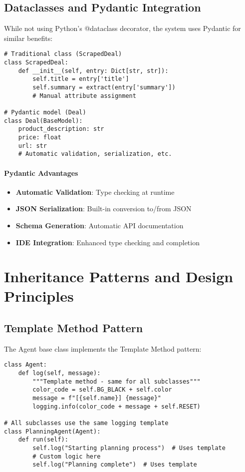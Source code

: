 \subsection{Dataclasses and Pydantic Integration}

While not using Python's @dataclass decorator, the system uses Pydantic for similar benefits:

\begin{lstlisting}[caption=Pydantic vs Traditional Classes]
# Traditional class (ScrapedDeal)
class ScrapedDeal:
    def __init__(self, entry: Dict[str, str]):
        self.title = entry['title']
        self.summary = extract(entry['summary'])
        # Manual attribute assignment

# Pydantic model (Deal)  
class Deal(BaseModel):
    product_description: str
    price: float
    url: str
    # Automatic validation, serialization, etc.
\end{lstlisting}

\paragraph{Pydantic Advantages}
\begin{itemize}
\item \textbf{Automatic Validation}: Type checking at runtime
\item \textbf{JSON Serialization}: Built-in conversion to/from JSON
\item \textbf{Schema Generation}: Automatic API documentation
\item \textbf{IDE Integration}: Enhanced type checking and completion
\end{itemize}

\section{Inheritance Patterns and Design Principles}

\subsection{Template Method Pattern}

The Agent base class implements the Template Method pattern:

\begin{lstlisting}[caption=Template Method Pattern]
class Agent:
    def log(self, message):
        """Template method - same for all subclasses"""
        color_code = self.BG_BLACK + self.color
        message = f"[{self.name}] {message}"
        logging.info(color_code + message + self.RESET)
        
# All subclasses use the same logging template
class PlanningAgent(Agent):
    def run(self):
        self.log("Starting planning process")  # Uses template
        # Custom logic here
        self.log("Planning complete")  # Uses template
\end{lstlisting}

